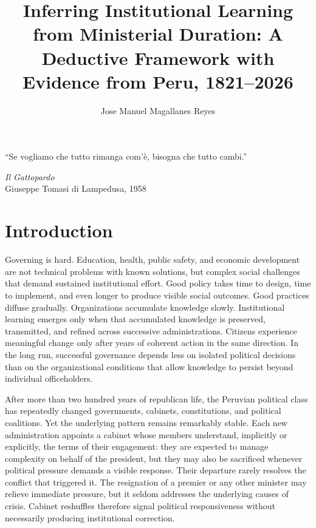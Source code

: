 \documentclass[doc, 12pt, a4paper,floatsintext]{apa7}
\title{Inferring Institutional Learning from Ministerial Duration: A Deductive Framework with Evidence from Peru, 1821--2026}
\author{Jose Manuel Magallanes Reyes}
\begin{document}



\maketitle 


\tableofcontents

\epigraph{``Se vogliamo che tutto rimanga com'è, bisogna che tutto cambi.''}
{\textit{Il Gattopardo} \\ Giuseppe Tomasi di Lampedusa, 1958}


\section*{Introduction}

%
Governing is hard. Education, health, public safety, and economic development are not technical problems with known solutions, but complex social challenges that demand sustained institutional effort. Good policy takes time to design, time to implement, and even longer to produce visible social outcomes. Good practices diffuse gradually. Organizations accumulate knowledge slowly. Institutional learning emerges only when that accumulated knowledge is preserved, transmitted, and refined across successive administrations. Citizens experience meaningful change only after years of coherent action in the same direction. In the long run, successful governance depends less on isolated political decisions than on the organizational conditions that allow knowledge to persist beyond individual officeholders.

After more than two hundred years of republican life, the Peruvian political class has repeatedly changed governments, cabinets, constitutions, and political coalitions. Yet the underlying pattern remains remarkably stable. Each new administration appoints a cabinet whose members understand, implicitly or explicitly, the terms of their engagement: they are expected to manage complexity on behalf of the president, but they may also be sacrificed whenever political pressure demands a visible response. Their departure rarely resolves the conflict that triggered it. The resignation of a premier or any other minister may relieve immediate pressure, but it seldom addresses the underlying causes of crisis. Cabinet reshuffles therefore signal political responsiveness without necessarily producing institutional correction.
\end{document}

